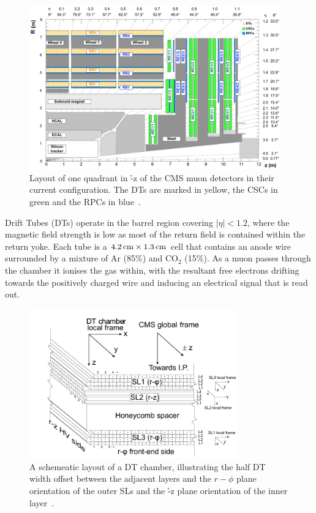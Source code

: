 \begin{figure}[htbp]
\begin{center}
\includegraphics[width=0.97\textwidth]{figs/cms/cms_muon_quadrant_run_ii.pdf}
\caption{Layout of one quadrant in \r-z of the CMS muon detectors in their current configuration.
The DTs are marked in yellow, the CSCs in green and the RPCs in blue~\cite{CMS-DP-2016-046}.}
\label{fig:muonChambers}
\end{center}
\end{figure}

Drift Tubes (DTs) operate in the barrel region covering $|\eta| < 1.2$, where the magnetic field strength is low as most of the return field is contained within the return yoke.
Each tube is a $4.2\,\text{cm} \times 1.3\,\text{cm}$ cell that contains an anode wire surrounded by a mixture of Ar (85\%) and CO$_{2}$ (15\%).
As a muon passes through the chamber it ionises the gas within, with the resultant free electrons drifting towards the positively charged wire and inducing an electrical signal that is read out.

\begin{figure}[htb]
\begin{center}
\includegraphics[width=0.8\textwidth]{figs/cms/DTchamber.png}
\caption{A schemeatic layout of a DT chamber, illustrating the half DT width offset between the adjacent layers and the $r-\phi$ plane orientation of the outer SLs and the \r-z plane orientation of the inner layer~\cite{Chatrchyan:2009hg}.}
\label{fig:dtSuperLayers}
\end{center}
\end{figure}

